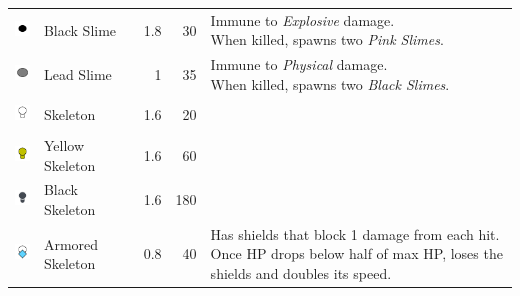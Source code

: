 \begin{table}[H]
\begin{tabular}{m{9mm}m{25mm}D{.}{.}{-1}rm{0.48\textwidth}}
        \includegraphics[height=7mm]{img/Icons/Attackers/Black Slime.png}             & \footnotesize{Black Slime}             & 1.8                 & 30               & \footnotesize{Immune to \emph{Explosive} damage. \newline When killed, spawns two \emph{Pink Slimes}.}                                              \\
        \includegraphics[height=7mm]{img/Icons/Attackers/Lead Slime.png}              & \footnotesize{Lead Slime}              & 1                   & 35               & \footnotesize{Immune to \emph{Physical} damage. \newline When killed, spawns two \emph{Black Slimes}.}                                              \\
        \includegraphics[height=7mm]{img/Icons/Attackers/Skeleton.png}                & \footnotesize{Skeleton}                & 1.6                 & 20               &                                                                                                                                                     \\
        \includegraphics[height=7mm]{img/Icons/Attackers/Yellow Skeleton.png}         & \footnotesize{Yellow Skeleton}         & 1.6                 & 60               &                                                                                                                                                     \\
        \includegraphics[height=7mm]{img/Icons/Attackers/Black Skeleton.png}          & \footnotesize{Black Skeleton}          & 1.6                 & 180              &                                                                                                                                                     \\
        \includegraphics[height=7mm]{img/Icons/Attackers/Armored Skeleton.png}        & \footnotesize{Armored Skeleton}        & 0.8                 & 40               & \footnotesize{Has shields that block 1 damage from each hit. \newline Once HP drops below half of max HP, loses the shields and doubles its speed.} \\

\end{tabular}
\end{table}
